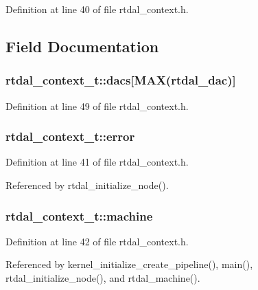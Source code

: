 Definition at line 40 of file rtdal\-\_\-context.\-h.



\subsection{Field Documentation}
\subsubsection[{dacs}]{ rtdal\-\_\-context\-\_\-t\-::dacs[{\bf M\-A\-X}(rtdal\-\_\-dac)]}\label{structrtdal__context__t_ae5e9258b89efd6790a20c761a6e12a35}


Definition at line 49 of file rtdal\-\_\-context.\-h.

\subsubsection[{error}]{ rtdal\-\_\-context\-\_\-t\-::error}\label{structrtdal__context__t_a16a803b2fd237c6c6af02727f13cca78}


Definition at line 41 of file rtdal\-\_\-context.\-h.



Referenced by rtdal\-\_\-initialize\-\_\-node().

\subsubsection[{machine}]{ rtdal\-\_\-context\-\_\-t\-::machine}\label{structrtdal__context__t_a3eb563f1d3980bcfa87524bd53e6a636}


Definition at line 42 of file rtdal\-\_\-context.\-h.



Referenced by kernel\-\_\-initialize\-\_\-create\-\_\-pipeline(), main(), rtdal\-\_\-initialize\-\_\-node(), and rtdal\-\_\-machine().


